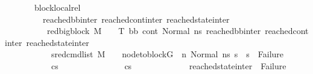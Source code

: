 \begin{isabellebody}
\ \ \ \ \ \ \ block{\isacharunderscore}{\kern0pt}local{\isacharunderscore}{\kern0pt}rel{\isacharcolon}{\kern0pt}\ \isanewline
\ \ \ \ \ \ \ \ {\isachardoublequoteopen}{\isasymAnd}\ reached{\isacharunderscore}{\kern0pt}bb{\isacharunderscore}{\kern0pt}inter\ reached{\isacharunderscore}{\kern0pt}cont{\isacharunderscore}{\kern0pt}inter\ reached{\isacharunderscore}{\kern0pt}state{\isacharunderscore}{\kern0pt}inter{\isachardot}{\kern0pt}\ \isanewline
\ \ \ \ \ \ \ \ \ \ {\isacharparenleft}{\kern0pt}red{\isacharunderscore}{\kern0pt}bigblock\ M\ {\isasymLambda}\ {\isasymGamma}\ {\isasymOmega}\ T\ {\isacharparenleft}{\kern0pt}bb{\isacharcomma}{\kern0pt}\ cont{}{\isacharcomma}{\kern0pt}\ {\isacharparenleft}{\kern0pt}Normal\ ns{}{\isacharparenright}{\kern0pt}{\isacharparenright}{\kern0pt}\ {\isacharparenleft}{\kern0pt}reached{\isacharunderscore}{\kern0pt}bb{\isacharunderscore}{\kern0pt}inter{\isacharcomma}{\kern0pt}\ reached{\isacharunderscore}{\kern0pt}cont{\isacharunderscore}{\kern0pt}inter{\isacharcomma}{\kern0pt}\ reached{\isacharunderscore}{\kern0pt}state{\isacharunderscore}{\kern0pt}inter{\isacharparenright}{\kern0pt}{\isacharparenright}{\kern0pt}\ {\isasymLongrightarrow}\ \isanewline
\ \ \ \ \ \ \ \ \ \ {\isacharparenleft}{\kern0pt}{\isasymAnd}\ s{}{\isacharprime}{\kern0pt}{\isachardot}{\kern0pt}{\isacharparenleft}{\kern0pt}{\isacharparenleft}{\kern0pt}red{\isacharunderscore}{\kern0pt}cmd{\isacharunderscore}{\kern0pt}list\ M\ {\isasymLambda}\ {\isasymGamma}\ {\isasymOmega}\ {\isacharparenleft}{\kern0pt}node{\isacharunderscore}{\kern0pt}to{\isacharunderscore}{\kern0pt}block{\isacharparenleft}{\kern0pt}G{\isacharparenright}{\kern0pt}\ {\isacharbang}{\kern0pt}\ n{\isacharparenright}{\kern0pt}\ {\isacharparenleft}{\kern0pt}Normal\ ns{}{\isacharparenright}{\kern0pt}\ s{}{\isacharprime}{\kern0pt}{\isacharparenright}{\kern0pt}\ {\isasymLongrightarrow}\ {\isacharparenleft}{\kern0pt}s{}{\isacharprime}{\kern0pt}\ {\isasymnoteq}\ Failure{\isacharparenright}{\kern0pt}{\isacharparenright}{\kern0pt}{\isacharparenright}{\kern0pt}\ {\isasymLongrightarrow}\ \ \ \isanewline
\ \ \ \ \ \ \ \ \ \ \ cs{}\ {\isasymnoteq}\ {\isacharbrackleft}{\kern0pt}{\isacharbrackright}{\kern0pt}\ {\isasymLongrightarrow}\ \isanewline
\ \ \ \ \ \ \ \ \ \ \ cs{}\ {\isasymnoteq}\ {\isacharbrackleft}{\kern0pt}{\isacharbrackright}{\kern0pt}\ {\isasymLongrightarrow}\isanewline
\ \ \ \ \ \ \ \ \ \ reached{\isacharunderscore}{\kern0pt}state{\isacharunderscore}{\kern0pt}inter\ {\isasymnoteq}\ Failure\ {\isasymand}\ \isanewline

\end{isabellebody}
